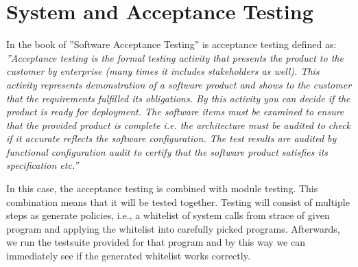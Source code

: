 %
%
%
%


\section{System and Acceptance Testing}
\label{acceptance_testing}
In the book of ''Software Acceptance Testing'' is acceptance testing defined as:
\emph{''Acceptance testing is the formal testing activity that presents the
product to the customer by enterprise (many times it includes stakeholders as
well). This activity represents demonstration of a software product and shows to
the customer that the requirements fulfilled its obligations. By this activity
you can decide if the product is ready for deployment. The software items must
be examined to ensure that the provided product is complete i.e. the
architecture must be audited to check if it accurate reflects the software
configuration. The test results are audited by functional configuration audit to
certify that the software product satisfies its specification etc.''}
\cite{Schmidt2013335}

In this case, the acceptance testing is combined with module testing. This
combination means that it will be tested together. Testing will consist of
multiple steps as generate policies, i.e., a whitelist of system calls from
strace of given program and applying the whitelist into carefully picked
programs. Afterwards, we run the testsuite provided for that program and by this
way we can immediately see if the generated whitelist works correctly.


